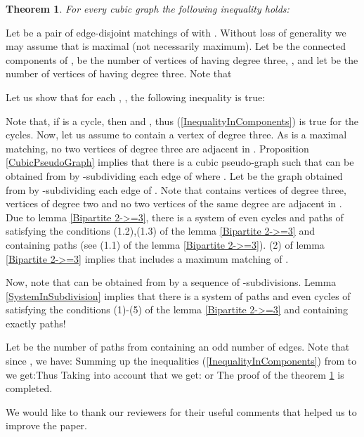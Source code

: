 \documentclass[fleqn,12pt,twoside]{article}
\newtheorem{theorem}{Theorem}
\newenvironment{proof}[1][Proof.]{\begin{trivlist}
\item[\hskip \labelsep {\bfseries #1}]}{\end{trivlist}}
\newenvironment{acknowledgement}[1][Acknowledgement]{\begin{trivlist}
\item[\hskip \labelsep {\bfseries #1}]}{\end{trivlist}}
\begin{document}
\begin{theorem}
\label{ArithmeticalMean}For every cubic graph  the following inequality holds:
\end{theorem}

\begin{proof}
Let  be a pair of edge-disjoint matchings of
 with . Without loss of generality we may assume that  is
maximal (not necessarily maximum). Let  be the
connected components of ,  be the
number of vertices of  having
degree three, , and let  be the number of vertices of  having degree three. Note that

Let us show that for each , , the following
inequality is
true:

Note that, if  is a cycle, then  and , thus (\ref{InequalityInComponents}) is true for the cycles.
Now, let us assume  to contain a vertex of degree three. As
 is a maximal matching, no two vertices of degree three are
adjacent in . Proposition
\ref{CubicPseudoGraph} implies that there is a cubic pseudo-graph  such that  can be obtained from  by -subdividing each edge  of  where . Let  be the graph obtained from
 by -subdividing each edge  of . Note
that 
contains  vertices of degree three,  vertices of degree two and no two vertices of
the same degree are adjacent in . Due to lemma
\ref{Bipartite 2->=3}, there is a system  of even cycles and paths of  satisfying the
conditions
(1.2),(1.3) of the lemma \ref{Bipartite 2->=3} and containing  paths (see (1.1) of the lemma \ref {Bipartite 2->=3}). (2) of lemma \ref{Bipartite 2->=3} implies that  includes a maximum matching of
.

Now, note that  can be obtained from  by a
sequence of -subdivisions. Lemma \ref{SystemInSubdivision}
implies that there is a system  of paths and even
cycles of  satisfying the conditions (1)-(5) of the lemma
\ref{Bipartite 2->=3} and containing exactly 
paths!

Let  be the number of paths from  containing an
odd number
of edges. Note that since , we have:
Summing up the inequalities (\ref{InequalityInComponents}) from 
to 
we get:Thus
Taking into account that
we get:
or
The proof of the theorem \ref{ArithmeticalMean} is completed.
\end{proof}


\begin{acknowledgement}
We would like to thank our reviewers for their useful comments that helped us to improve the paper.
\end{acknowledgement}
\end{document}
